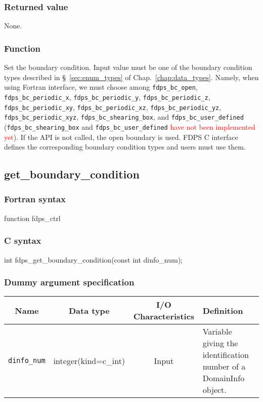 \subsubsection*{Returned value}
None.

\subsubsection*{Function}
Set the boundary condition. Input value must be one of the boundary condition types described in \S~\ref{sec:enum_types} of Chap.~\ref{chap:data_types}. Namely, when using Fortran interface, we must choose among \texttt{fdps\_bc\_open}, \texttt{fdps\_bc\_periodic\_x}, \texttt{fdps\_bc\_periodic\_y}, \texttt{fdps\_bc\_periodic\_z}, \texttt{fdps\_bc\_periodic\_xy}, \texttt{fdps\_bc\_periodic\_xz}, \texttt{fdps\_bc\_periodic\_yz}, \texttt{fdps\_bc\_periodic\_xyz}, \texttt{fdps\_bc\_shearing\_box}, and \texttt{fdps\_bc\_user\_defined} (\texttt{fdps\_bc\_shearing\_box} and \texttt{fdps\_bc\_user\_defined} \textcolor{red}{have not been implemented yet}). If the API is not called, the open boundary is used. FDPS C interface defines the corresponding boundary condition types and users must use them.

\clearpage

\subsection{get\_boundary\_condition}
\subsubsection*{Fortran syntax}
\begin{screen}
\begin{spverbatim}
function fdps_ctrl%
\end{spverbatim}
\end{screen}

\subsubsection*{C syntax}
\begin{screen}
\begin{spverbatim}
int fdps_get_boundary_condition(const int dinfo_num);
\end{spverbatim}
\end{screen}

\subsubsection*{Dummy argument specification}
\begin{table}[h]
\begin{tabularx}{\linewidth}{cccX}
\toprule
\rowcolor{Snow2}
Name & Data type & I/O Characteristics & Definition \\
\midrule
\texttt{dinfo\_num} & integer(kind=c\_int) & Input & Variable giving the identification number of a DomainInfo object.\\
\bottomrule
\end{tabularx}
\end{table}

